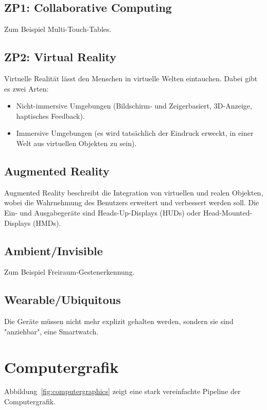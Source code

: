 		\subsection{ZP1: Collaborative Computing}
			Zum Beispiel Multi-Touch-Tables.

		\subsection{ZP2: Virtual Reality}
			Virtuelle Realität lässt den Menschen in virtuelle Welten eintauchen. Dabei gibt es zwei Arten:
			\begin{itemize}
				\item Nicht-immersive Umgebungen (Bildschirm- und Zeigerbasiert, 3D-Anzeige, \mglw haptisches Feedback).
				\item Immersive Umgebungen (es wird tatsächlich der Eindruck erweckt, in einer Welt aus virtuellen Objekten zu sein).
			\end{itemize}

		\subsection{Augmented Reality}
			Augmented Reality beschreibt die Integration von virtuellen und realen Objekten, wobei die Wahrnehmung des Benutzers erweitert und verbessert werden soll. Die Ein- und Ausgabegeräte sind \zB Heads-Up-Displays (HUDs) oder Head-Mounted-Displays (HMDs).

		\subsection{Ambient/Invisible}
			Zum Beispiel Freiraum-Gestenerkennung.

		\subsection{Wearable/Ubiquitous}
			Die Geräte müssen nicht mehr explizit gehalten werden, sondern sie sind "anziehbar", \zB eine Smartwatch.

	\section{Computergrafik}
		Abbildung~\ref{fig:computergraphics} zeigt eine stark vereinfachte Pipeline der Computergrafik.
	
